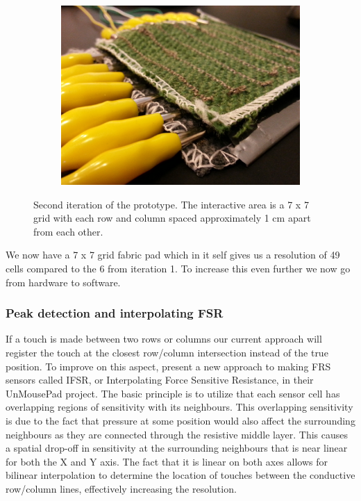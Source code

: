 \begin{figure}[h]
\begin{subfigure}[t]{.44\textwidth}
  \centering
  \includegraphics[width=\linewidth]{figures/touch/proto2_2}
\end{subfigure}
\caption{Second iteration of the prototype. The interactive area is a 7 x 7 grid with each row and column spaced approximately 1 cm apart from each other.}
\label{prototype_2}
\end{figure}

We now have a 7 x 7 grid fabric pad which in it self gives us a resolution of 49 cells compared to the 6 from iteration 1.
To increase this even further we now go from hardware to software.

\subsubsection{Peak detection and interpolating FSR}
\label{ch:textiletouch:it2-ifsr}
If a touch is made between two rows or columns our current approach will register the touch at the closest row/column intersection instead of the true position.
To improve on this aspect, \citet{rosenberg2009unmousepad} present a new approach to making FRS sensors called IFSR, or Interpolating Force Sensitive Resistance, in their UnMousePad project. The basic principle is to utilize that each sensor cell has overlapping regions of sensitivity with its neighbours.
This overlapping sensitivity is due to the fact that pressure at some position would also affect the surrounding neighbours as they are connected through the resistive middle layer.
This causes a spatial drop-off in sensitivity at the surrounding neighbours that is near linear for both the X and Y axis.
The fact that it is linear on both axes allows for bilinear interpolation to determine the location of touches between the conductive row/column lines, effectively increasing the resolution. 

